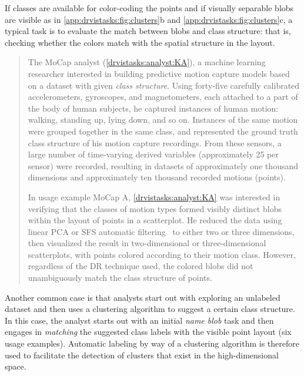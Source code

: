 If classes are available for color-coding the points and if visually separable blobs are visible as in \autoref{app:drvistasks:fig:clusters}b and \autoref{app:drvistasks:fig:clusters}c, a typical task is to evaluate the match between blobs and class structure: that is, checking whether the colors match with the spatial structure in the layout.  

\begin{quotation}
    The {\sc MoCap} analyst (\ref{drvistasks:analyst:KA}), a machine learning researcher
    interested in building predictive motion capture models
    based on a dataset with given {\it class structure}. 
    Using forty-five carefully calibrated accelerometers, gyroscopes, and magnetometers, each attached to a part of the body of human subjects, he captured instances of human motion: walking, standing up, lying down, and so on. 
    Instances of the same motion were grouped together in the same class, and represented the ground truth class structure of his motion capture recordings.
    From these sensors, a large number of time-varying derived variables (approximately 25 per sensor) were recorded, resulting in datasets of approximately one thousand dimensions and approximately ten thousand recorded motions (points). 

    In usage example {\sc MoCap A}, \ref{drvistasks:analyst:KA} was interested in verifying that the classes of motion types formed visibly distinct blobs within the layout of points in a scatterplot. 
    He reduced the data using linear \ac{PCA} or \ac{SFS} automatic filtering~\cite{Jain2000} to either two or three dimensions, then visualized the result in two-dimensional or three-dimensional scatterplots, with points colored according to their motion class. 
    However, regardless of the \ac{DR} technique used, the colored blobs did not unambiguously match the class structure of points. 
\end{quotation}

Another common case is that analysts start out with exploring an unlabeled dataset and then uses a clustering algorithm to suggest a certain class structure. 
In this case, the analyst starts out with an initial {\it name blob} task and then engages in {\it matching} the suggested class labels with the visible point layout (six usage examples). 
Automatic labeling by way of a clustering algorithm is therefore used to facilitate the detection of clusters that exist in the high-dimensional space.

